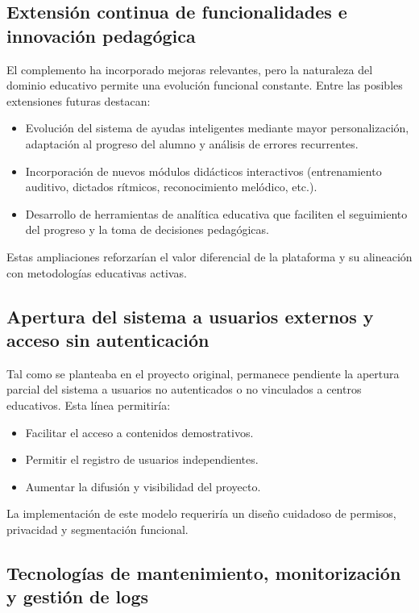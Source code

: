\subsection{Extensión continua de funcionalidades e innovación pedagógica}

El complemento ha incorporado mejoras relevantes, pero la naturaleza del dominio educativo permite una evolución funcional constante. Entre las posibles extensiones futuras destacan:

\begin{itemize}
    \item Evolución del sistema de ayudas inteligentes mediante mayor personalización, adaptación al progreso del alumno y análisis de errores recurrentes.
    \item Incorporación de nuevos módulos didácticos interactivos (entrenamiento auditivo, dictados rítmicos, reconocimiento melódico, etc.).
    \item Desarrollo de herramientas de analítica educativa que faciliten el seguimiento del progreso y la toma de decisiones pedagógicas.
\end{itemize}

Estas ampliaciones reforzarían el valor diferencial de la plataforma y su alineación con metodologías educativas activas.

\subsection{Apertura del sistema a usuarios externos y acceso sin autenticación}

Tal como se planteaba en el proyecto original, permanece pendiente la apertura parcial del sistema a usuarios no autenticados o no vinculados a centros educativos. Esta línea permitiría:

\begin{itemize}
    \item Facilitar el acceso a contenidos demostrativos.
    \item Permitir el registro de usuarios independientes.
    \item Aumentar la difusión y visibilidad del proyecto.
\end{itemize}

La implementación de este modelo requeriría un diseño cuidadoso de permisos, privacidad y segmentación funcional.

\subsection{Tecnologías de mantenimiento, monitorización y gestión de logs}

